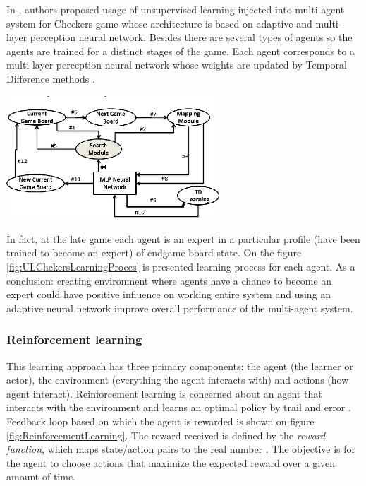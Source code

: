 In \cite{Duarte2015MPDraughtsUL}, authors proposed usage of unsupervised learning injected into multi-agent system for Checkers game whose architecture is based on adaptive and multi-layer perception neural network. Besides there are several types of agents so the agents are trained for a distinct stages of the game. Each agent corresponds to a multi-layer perception neural network whose weights are updated by Temporal Difference methods \cite{TemporalDifferenceLearning}.

\begin{center}
	\includegraphics[width=8cm, keepaspectratio]{diagrams/related_work/ULCheckers}
	\center
	\label{fig:ULChekersLearningProces}
\end{center}

In fact, at the late game each agent is an expert in a particular profile (have been trained to become an expert) of endgame board-state. On the figure \ref{fig:ULChekersLearningProces} is presented learning process for each agent.
As a conclusion: creating environment where agents have a chance to become an expert could have positive influence on working entire system and using an adaptive neural network improve overall performance of the multi-agent system.

\subsubsection{Reinforcement learning}
This learning approach has three primary components: the agent (the learner or actor), the environment (everything the agent interacts with) and actions (how agent interact). Reinforcement learning is concerned about an agent that interacts with the environment and learns an optimal policy by trail and error \cite{ReinforcementLearning2}.  Feedback loop based on which the agent is rewarded is shown on figure \ref{fig:ReinforcementLearning}. The reward received is defined by the \emph{reward function}, which maps state/action pairs to the real number \cite{ReinforcementLearning1}. The objective is for the agent to choose actions that maximize the expected reward over a given amount of time.

